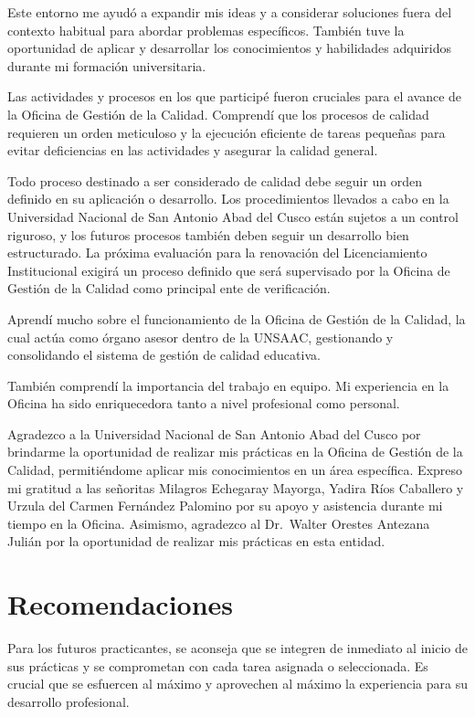 \documentclass[
  12pt,
  letterpaper,
]{scrreprt}
\begin{document}
Este entorno me ayudó a expandir mis ideas y a considerar soluciones
fuera del contexto habitual para abordar problemas específicos. También
tuve la oportunidad de aplicar y desarrollar los conocimientos y
habilidades adquiridos durante mi formación universitaria.

Las actividades y procesos en los que participé fueron cruciales para el
avance de la Oficina de Gestión de la Calidad. Comprendí que los
procesos de calidad requieren un orden meticuloso y la ejecución
eficiente de tareas pequeñas para evitar deficiencias en las actividades
y asegurar la calidad general.

Todo proceso destinado a ser considerado de calidad debe seguir un orden
definido en su aplicación o desarrollo. Los procedimientos llevados a
cabo en la Universidad Nacional de San Antonio Abad del Cusco están
sujetos a un control riguroso, y los futuros procesos también deben
seguir un desarrollo bien estructurado. La próxima evaluación para la
renovación del Licenciamiento Institucional exigirá un proceso definido
que será supervisado por la Oficina de Gestión de la Calidad como
principal ente de verificación.

Aprendí mucho sobre el funcionamiento de la Oficina de Gestión de la
Calidad, la cual actúa como órgano asesor dentro de la UNSAAC,
gestionando y consolidando el sistema de gestión de calidad educativa.

También comprendí la importancia del trabajo en equipo. Mi experiencia
en la Oficina ha sido enriquecedora tanto a nivel profesional como
personal.

Agradezco a la Universidad Nacional de San Antonio Abad del Cusco por
brindarme la oportunidad de realizar mis prácticas en la Oficina de
Gestión de la Calidad, permitiéndome aplicar mis conocimientos en un
área específica. Expreso mi gratitud a las señoritas Milagros Echegaray
Mayorga, Yadira Ríos Caballero y Urzula del Carmen Fernández Palomino
por su apoyo y asistencia durante mi tiempo en la Oficina. Asimismo,
agradezco al Dr.~Walter Orestes Antezana Julián por la oportunidad de
realizar mis prácticas en esta entidad.


\chapter{Recomendaciones}\label{recomendaciones}

Para los futuros practicantes, se aconseja que se integren de inmediato
al inicio de sus prácticas y se comprometan con cada tarea asignada o
seleccionada. Es crucial que se esfuercen al máximo y aprovechen al
máximo la experiencia para su desarrollo profesional.
\end{document}
